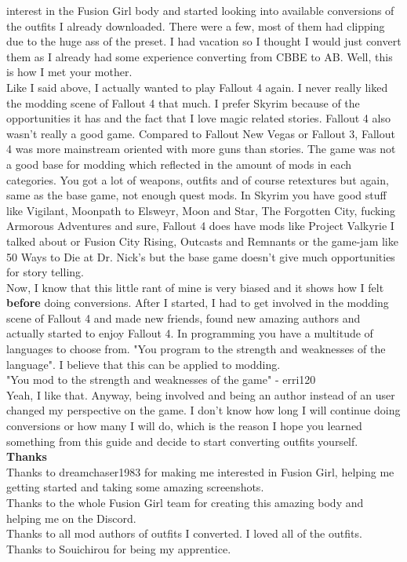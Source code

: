 interest in the Fusion Girl body and started looking into available conversions of the outfits I already downloaded. There were a few, 
most of them had clipping due to the huge ass of the preset. I had vacation so I thought I would just convert them as I already had 
some experience converting from CBBE to AB. Well, this is how I met your mother.\\
Like I said above, I actually wanted to play Fallout 4 again. I never really liked the modding scene of Fallout 4 that much. I prefer 
Skyrim because of the opportunities it has and the fact that I love magic related stories. Fallout 4 also wasn't really a good game.
Compared to Fallout New Vegas or Fallout 3, Fallout 4 was more mainstream oriented with more guns than stories. The game was not a 
good base for modding which reflected in the amount of mods in each categories. You got a lot of weapons, outfits and of course retextures 
but again, same as the base game, not enough quest mods. In Skyrim you have good stuff like Vigilant, Moonpath to Elsweyr, Moon and Star,
The Forgotten City, fucking Armorous Adventures and sure, Fallout 4 does have mods like Project Valkyrie I talked about or Fusion City 
Rising, Outcasts and Remnants or the game-jam like 50 Ways to Die at Dr. Nick's but the base game doesn't give much opportunities for 
story telling.\\
Now, I know that this little rant of mine is very biased and it shows how I felt \textbf{before} doing conversions. After I started, I 
had to get involved in the modding scene of Fallout 4 and made new friends, found new amazing authors and actually started to enjoy 
Fallout 4. In programming you have a multitude of languages to choose from. "You program to the strength and weaknesses of the language".
I believe that this can be applied to modding.\\
"You mod to the strength and weaknesses of the game" - erri120\\
Yeah, I like that. Anyway, being involved and being an author instead of an user changed my perspective on the game. I don't know how 
long I will continue doing conversions or how many I will do, which is the reason I hope you learned something from this guide and 
decide to start converting outfits yourself.\\
\textbf{Thanks}\\
Thanks to dreamchaser1983 for making me interested in Fusion Girl, helping me getting started and taking some amazing screenshots.\\
Thanks to the whole Fusion Girl team for creating this amazing body and helping me on the Discord.\\
Thanks to all mod authors of outfits I converted. I loved all of the outfits.\\
Thanks to Souichirou for being my apprentice.\\